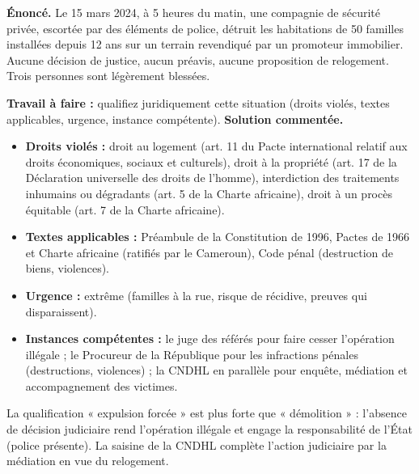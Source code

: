 \documentclass[11pt]{article}
\begin{document}
\begin{exoresolu}
\textbf{Énoncé.} Le 15 mars 2024, à 5 heures du matin, une compagnie de sécurité privée, escortée par des éléments de police, détruit les habitations de 50 familles installées depuis 12 ans sur un terrain revendiqué par un promoteur immobilier. Aucune décision de justice, aucun préavis, aucune proposition de relogement. Trois personnes sont légèrement blessées.

\textbf{Travail à faire :} qualifiez juridiquement cette situation (droits violés, textes applicables, urgence, instance compétente).
\tcblower
\textbf{Solution commentée.}
\begin{itemize}
    \item \textbf{Droits violés :} droit au logement (art. 11 du Pacte international relatif aux droits économiques, sociaux et culturels), droit à la propriété (art. 17 de la Déclaration universelle des droits de l'homme), interdiction des traitements inhumains ou dégradants (art. 5 de la Charte africaine), droit à un procès équitable (art. 7 de la Charte africaine).
    \item \textbf{Textes applicables :} Préambule de la Constitution de 1996, Pactes de 1966 et Charte africaine (ratifiés par le Cameroun), Code pénal (destruction de biens, violences).
    \item \textbf{Urgence :} extrême (familles à la rue, risque de récidive, preuves qui disparaissent).
    \item \textbf{Instances compétentes :} le juge des référés pour faire cesser l'opération illégale ; le Procureur de la République pour les infractions pénales (destructions, violences) ; la CNDHL en parallèle pour enquête, médiation et accompagnement des victimes.
\end{itemize}
La qualification « expulsion forcée » est plus forte que « démolition » : l'absence de décision judiciaire rend l'opération illégale et engage la responsabilité de l'État (police présente). La saisine de la CNDHL complète l'action judiciaire par la médiation en vue du relogement.
\end{exoresolu}
\end{document}
